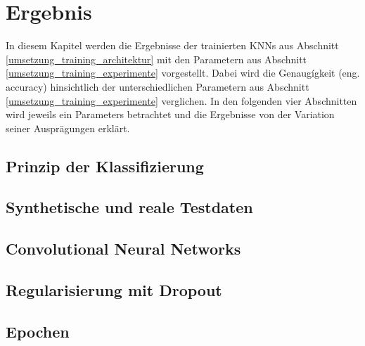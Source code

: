 

\chapter{Ergebnis}
\label{ergebnis}

In diesem Kapitel werden die Ergebnisse der trainierten \acp{KNN} aus Abschnitt \ref{umsetzung_training_architektur} mit den Parametern aus Abschnitt \ref{umsetzung_training_experimente} vorgestellt. Dabei wird die Genaugígkeit (eng. accuracy) hinsichtlich der unterschiedlichen Parametern aus Abschnitt \ref{umsetzung_training_experimente} verglichen. In den folgenden vier Abschnitten wird jeweils ein Parameters betrachtet und die Ergebnisse von der Variation seiner Ausprägungen erklärt.


\section{Prinzip der Klassifizierung}
\label{ergebnis_prinzip}




\section{Synthetische und reale Testdaten}
\label{ergebnis_synth_vs_real}



\section{Convolutional Neural Networks}
\label{ergebnis_cnn}




\section{Regularisierung mit Dropout}
\label{ergebnis_dropout}




\section{Epochen}
\label{ergebnis_epochen}












